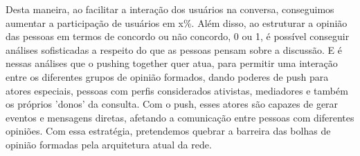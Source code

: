 \documentclass{llncs}
\begin{document}
  Desta maneira, ao facilitar a interação dos usuários na conversa, conseguimos
  aumentar a participação de usuários em x\%. Além disso, ao estruturar
  a opinião das pessoas em termos de concordo ou não concordo, 0 ou 1, é
  possível conseguir análises sofisticadas a respeito do que as pessoas
  pensam sobre a discussão. E é nessas análises que o pushing together quer atua,
  para permitir uma interação entre os diferentes grupos de opinião formados, dando
  poderes de push para atores especiais, pessoas com perfis considerados ativistas,
  mediadores e também os próprios 'donos' da consulta. Com o push, esses atores
  são capazes de gerar eventos e mensagens diretas, afetando a comunicação
  entre pessoas com diferentes opiniões. Com essa estratégia, pretendemos
  quebrar a barreira das bolhas de opinião formadas pela arquitetura
  atual da rede.

%
%
\end{document}
